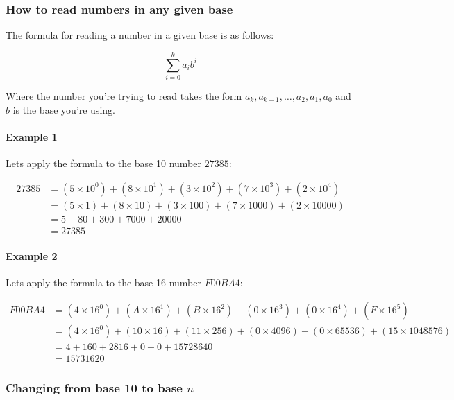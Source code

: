 \documentclass{article}
\begin{document}
\subsubsection{How to read numbers in any given base}

The formula for reading a number in a given base is as follows:

\[
	\sum_{i=0}^{k}a_{i}b^{i}
\]

Where the number you're trying to read takes the form $a_k, a_{k-1}, \ldots, a_2, a_1, a_0$ and $b$ is the base you're using.

\paragraph{Example 1}

Lets apply the formula to the base 10 number $27385$:

\[
	\begin{split}
		27385 &= (5 \times 10^0) + (8 \times 10^1) + (3 \times 10^2) + (7 \times 10^3) + (2 \times 10^4)\\
		      &= (5 \times 1) + (8 \times 10) + (3 \times 100) + (7 \times 1000) + (2 \times 10000)\\
		      &= 5 + 80 + 300 + 7000 + 20000\\
		      &= 27385
	\end{split}
\]

\paragraph{Example 2}

Lets apply the formula to the base 16 number $F00BA4$:

\[
	\begin{split}
		F00BA4 &= (4 \times 16^0) + (A \times 16^1) + (B \times 16^2) + (0 \times 16^3) + (0 \times 16^4) + (F \times 16^5)\\
		       &= (4 \times 16^0) + (10 \times 16) + (11 \times 256) + (0 \times 4096) + (0 \times 65536) + (15 \times 1048576)\\
		       &= 4 + 160 + 2816 + 0 + 0 + 15728640\\
		       &= 15731620
	\end{split}
\]

\subsubsection{Changing from base 10 to base $n$}
\end{document}
